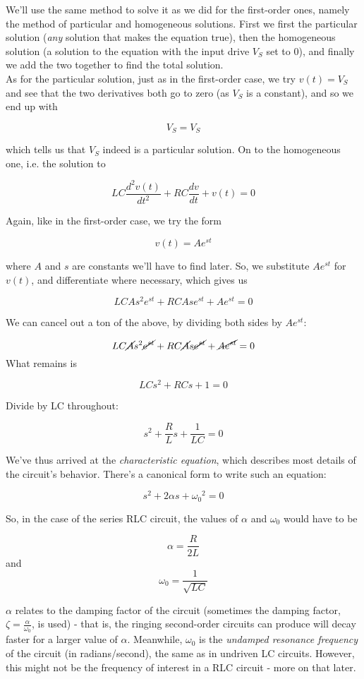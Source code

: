 \documentclass[12pt,a4paper]{report}
\begin{document}
We'll use the same method to solve it as we did for the first-order ones, namely the method of particular and homogeneous solutions. First we first the particular solution (\emph{any} solution that makes the equation true), then the homogeneous solution (a solution to the equation with the input drive $V_S$ set to 0), and finally we add the two together to find the total solution.\\

As for the particular solution, just as in the first-order case, we try $v(t) = V_S$ and see that the two derivatives both go to zero (as $V_S$ is a constant), and so we end up with

\[ V_S = V_S \]

which tells us that $V_S$ indeed is a particular solution. On to the homogeneous one, i.e. the solution to 

\[ LC \frac{d^2v(t)}{dt^2} + RC \frac{dv}{dt} + v(t) = 0\]

Again, like in the first-order case, we try the form 

\[ v(t) = Ae^{st} \]

where $A$ and $s$ are constants we'll have to find later. So, we substitute $Ae^{st}$ for $v(t)$, and differentiate where necessary, which gives us

\[ LC As^2 e^{st} + RC As e^{st} + A e^{st} = 0 \]

We can cancel out a ton of the above, by dividing both sides by $A e^{st}$:

\[ LC \cancel{A} s^2 \cancel{e^{st}} + RC \cancel{A}s \cancel{e^{st}} + \cancel{A e^{st}} = 0 \]
What remains is

\[ LC s^2 + RC s + 1 = 0 \]

Divide by LC throughout:

\[ s^2 + \frac{R}{L} s + \frac{1}{LC} = 0 \]

We've thus arrived at the \emph{characteristic equation}, which describes most details of the circuit's behavior. There's a canonical form to write such an equation:

\[ s^2 + 2\alpha s + {\omega_0}^2 = 0 \]

So, in the case of the series RLC circuit, the values of $\alpha$ and $\omega_0$ would have to be

\[ \alpha = \frac{R}{2L} \]
and
\[ \omega_0 = \frac{1}{\sqrt{LC}} \]

$\alpha$ relates to the damping factor of the circuit (sometimes the damping factor, $\displaystyle \zeta = \frac{\alpha}{\omega_0}$, is used) - that is, the ringing second-order circuits can produce will decay faster for a larger value of $\alpha$. Meanwhile, $\omega_0$ is the \emph{undamped resonance frequency} of the circuit (in radians/second), the same as in undriven LC circuits. However, this might not be the frequency of interest in a RLC circuit - more on that later.\\
\end{document}
